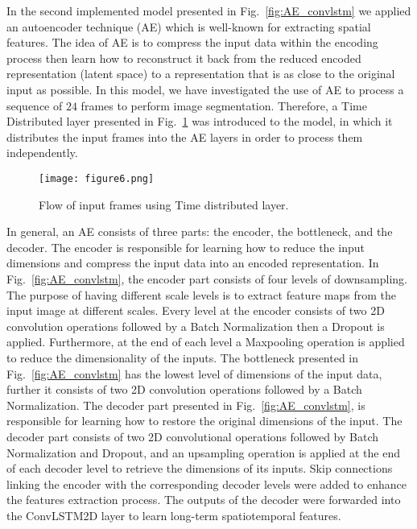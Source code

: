 In the second implemented model presented in Fig.~\ref{fig:AE_convlstm} we applied an autoencoder technique (AE) which is well-known for extracting spatial features.
The idea of AE is to compress the input data within the encoding process then learn how to reconstruct it back from the reduced encoded representation (latent space) to a representation that is as close to the original input as possible. 
In this model, we have investigated the use of AE to process a sequence of \(24\) frames to perform image segmentation.
Therefore, a Time Distributed layer presented in Fig.~\ref{fig:TD} was introduced to the model, in which it distributes the input frames into the AE layers in order to process them independently.
\begin{figure}[!h]
	\centering
	\texttt{[image: figure6.png]}
	\caption{Flow of input frames using Time distributed layer.}
	\label{fig:TD}
\end{figure}

In general, an AE consists of three parts: the encoder, the bottleneck, and the decoder.
The encoder is responsible for learning how to reduce the input dimensions and compress the input data into an encoded representation.
In Fig.~\ref{fig:AE_convlstm}, the encoder part consists of four levels of downsampling. 
The purpose of having different scale levels is to extract feature maps from the input image at different scales.
Every level at the encoder consists of two 2D convolution operations followed by a Batch Normalization then a Dropout is applied. 
Furthermore, at the end of each level a Maxpooling operation is applied to reduce the dimensionality of the inputs. 
The bottleneck presented in Fig.~\ref{fig:AE_convlstm} has the lowest level of dimensions of the input data, further it consists of two 2D convolution operations followed by a Batch Normalization.
The decoder part presented in Fig.~\ref{fig:AE_convlstm}, is responsible for learning how to restore the original dimensions of the input.
The decoder part consists of two 2D convolutional operations followed by Batch Normalization and Dropout, and an upsampling operation is applied at the end of each decoder level to retrieve the dimensions of its inputs.
Skip connections linking the encoder with the corresponding decoder levels were added to enhance the features extraction process.
The outputs of the decoder were forwarded into the ConvLSTM2D layer to learn long-term spatiotemporal features.

